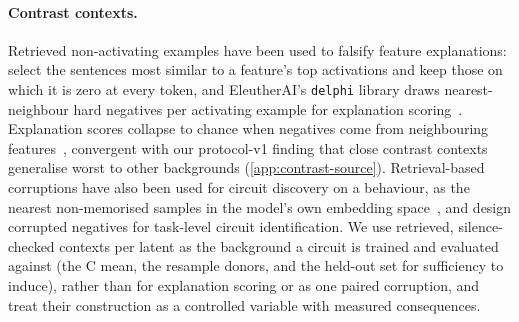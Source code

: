 \documentclass[10pt]{article}
\begin{document}
\paragraph{Contrast contexts.}
Retrieved non-activating examples have been used to falsify feature explanations: \citet{ma2025revising} select the sentences most similar to a feature's top activations and keep those on which it is zero at every token, and EleutherAI's \texttt{delphi} library draws nearest-neighbour hard negatives per activating example for explanation scoring~\citep{eleuther2024delphi}. Explanation scores collapse to chance when negatives come from neighbouring features~\citep{eleuther2024autointerp}, convergent with our protocol-v1 finding that close contrast contexts generalise worst to other backgrounds (\cref{app:contrast-source}). Retrieval-based corruptions have also been used for circuit discovery on a behaviour, as the nearest non-memorised samples in the model's own embedding space~\citep{lasy2025memorization}, and \citet{oneill2024sparse} design corrupted negatives for task-level circuit identification.
We use retrieved, silence-checked contexts per latent as the background a circuit is trained and evaluated against (the C mean, the resample donors, and the held-out set for sufficiency to induce), rather than for explanation scoring or as one paired corruption, and treat their construction as a controlled variable with measured consequences.
\end{document}
